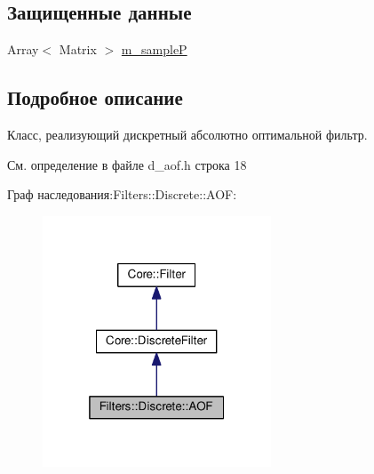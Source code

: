 \subsection*{Защищенные данные}
\begin{DoxyCompactItemize}
\item 
Array$<$ Matrix $>$ \hyperlink{class_filters_1_1_discrete_1_1_a_o_f_aef55ce0cf7129bb7090f8e470bcfbc1f}{m\+\_\+sampleP}
\end{DoxyCompactItemize}


\subsection{Подробное описание}
Класс, реализующий дискретный абсолютно оптимальной фильтр. 

См. определение в файле d\+\_\+aof.\+h строка 18



Граф наследования\+:Filters\+:\+:Discrete\+:\+:A\+OF\+:
\nopagebreak
\begin{figure}[H]
\begin{center}
\leavevmode
\includegraphics[width=193pt]{class_filters_1_1_discrete_1_1_a_o_f__inherit__graph}
\end{center}
\end{figure}


